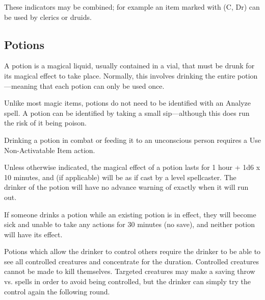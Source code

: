 \begin{multicols*}{2}
These indicators may be combined; for example an item marked with (C, Dr) can be used by clerics or druids.

\subsection{Potions}
A potion is a magical liquid, usually contained in a vial, that must be drunk for its magical effect to take place. Normally, this involves drinking the entire potion—meaning that each potion can only be used once.

Unlike most magic items, potions do not need to be identified with an Analyze spell. A potion can be identified by taking a small sip—although this does run the risk of it being poison.

Drinking a potion in combat or feeding it to an unconscious person requires a Use Non-Activatable Item action.

Unless otherwise indicated, the magical effect of a potion lasts for 1 hour + 1d6 x 10 minutes, and (if applicable) will be as if cast by a  level spellcaster. The drinker of the potion will have no advance warning of exactly when it will run out.

If someone drinks a potion while an existing potion is in effect, they will become sick and unable to take any actions for 30 minutes (no save), and neither potion will have its effect.

Potions which allow the drinker to control others require the drinker to be able to see all controlled creatures and concentrate for the duration. Controlled creatures cannot be made to kill themselves. Targeted creatures may make a saving throw vs. spells in order to avoid being controlled, but the drinker can simply try the control again the following round.


\end{multicols*}
